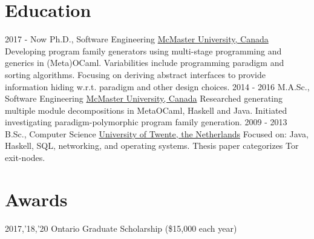 \documentclass[letterpaper]{twentysecondcv} %
\begin{document}
\section{Education}
\begin{twenty} %
  \twentyitem
  {2017 - Now}
  {}
  {Ph.D., Software Engineering}
  {\href{https://www.mcmaster.ca/}{McMaster University, Canada}}
  {
    Developing program family generators using multi-stage programming and generics in (Meta)OCaml.
    Variabilities include programming paradigm and sorting algorithms. Focusing on deriving abstract interfaces to provide information hiding w.r.t. paradigm and other design choices.
  }
  {}
  \twentyitem
  {2014 - 2016}
  {}
  {M.A.Sc., Software Engineering}
  {\href{https://www.mcmaster.ca/}{McMaster University, Canada}}
  {
    Researched generating multiple module decompositions in MetaOCaml, Haskell and Java.
    Initiated investigating paradigm-polymorphic program family generation.
  }
  {}
  \twentyitem
  {2009 - 2013}
  {}
  {B.Sc., Computer Science}%
  {\href{https://www.utwente.nl/}{University of Twente, the Netherlands}}
  {Focused on: Java, Haskell, SQL, networking, and operating systems. Thesis paper categorizes Tor exit-nodes.}
  {}
\end{twenty}
\vspace{-.5em}
\section{Awards}
\begin{twenty}
  \twentyitem
  {2017,'18,'20}
  {}
  {Ontario Graduate Scholarship \textnormal{(\$15,000 each year)}}
	{}
	{}
	{}
%
%	
\end{twenty}
\end{document}
